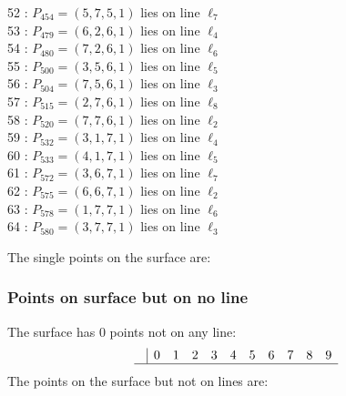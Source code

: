 \documentclass{article}
\begin{document}
{\begin{multicols}{2}
52 : $P_{454}=( 5, 7, 5, 1 )$ lies on line $\ell_{7}$\\
53 : $P_{479}=( 6, 2, 6, 1 )$ lies on line $\ell_{4}$\\
54 : $P_{480}=( 7, 2, 6, 1 )$ lies on line $\ell_{6}$\\
55 : $P_{500}=( 3, 5, 6, 1 )$ lies on line $\ell_{5}$\\
56 : $P_{504}=( 7, 5, 6, 1 )$ lies on line $\ell_{3}$\\
57 : $P_{515}=( 2, 7, 6, 1 )$ lies on line $\ell_{8}$\\
58 : $P_{520}=( 7, 7, 6, 1 )$ lies on line $\ell_{2}$\\
59 : $P_{532}=( 3, 1, 7, 1 )$ lies on line $\ell_{4}$\\
60 : $P_{533}=( 4, 1, 7, 1 )$ lies on line $\ell_{5}$\\
61 : $P_{572}=( 3, 6, 7, 1 )$ lies on line $\ell_{7}$\\
62 : $P_{575}=( 6, 6, 7, 1 )$ lies on line $\ell_{2}$\\
63 : $P_{578}=( 1, 7, 7, 1 )$ lies on line $\ell_{6}$\\
64 : $P_{580}=( 3, 7, 7, 1 )$ lies on line $\ell_{3}$\\
\end{multicols}
The single points on the surface are:\\
\subsubsection*{Points on surface but on no line}
The surface has 0 points not on any line:\\
$$
\begin{array}{r|*{10}{r}}
 & 0 & 1 & 2 & 3 & 4 & 5 & 6 & 7 & 8 & 9\\
\hline
\end{array}
$$
The points on the surface but not on lines are:\\
\begin{multicols}{2}
\noindent
\end{multicols}
}
\end{document}
